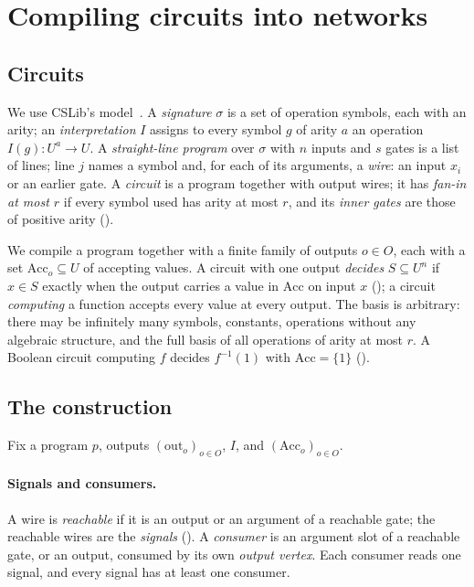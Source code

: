 \documentclass[11pt]{article}
\theoremstyle{plain}
\theoremstyle{definition}
\theoremstyle{remark}
\newcommand{\Acc}{\mathrm{Acc}}
\begin{document}
\section{Compiling circuits into networks}
\label{sec:compiler}

\subsection{Circuits}

We use CSLib's model~\cite{CSLib}. A \emph{signature} $\sigma$ is a set of operation symbols,
each with an arity; an \emph{interpretation} $I$ assigns to every symbol $g$ of arity $a$ an
operation $I(g) \colon U^a \to U$. A \emph{straight-line program} over $\sigma$ with $n$ inputs
and $s$ gates is a list of lines; line $j$ names a symbol and, for each of its arguments, a
\emph{wire}: an input $x_i$ or an earlier gate. A \emph{circuit} is a program together with
output wires; it has \emph{fan-in at most $r$} if every symbol used has arity at most $r$, and
its \emph{inner gates} are those of positive arity ().

We compile a program together with a finite family of outputs $o \in O$, each with a set
$\Acc_o \subseteq U$ of accepting values. A circuit with one output \emph{decides}
$S \subseteq U^n$ if $x \in S$ exactly when the output carries a value in $\Acc$ on input $x$
(); a circuit \emph{computing} a function accepts every value at every
output. The basis is arbitrary: there may be infinitely many symbols, constants, operations
without any algebraic structure, and the full basis of all operations of arity at most $r$. A
Boolean circuit computing $f$ decides $f^{-1}(1)$ with $\Acc = \{1\}$
().

\subsection{The construction}

Fix a program $p$, outputs $(\mathrm{out}_o)_{o \in O}$, $I$, and $(\Acc_o)_{o \in O}$.

\paragraph{Signals and consumers.} A wire is \emph{reachable} if it is an output or an argument
of a reachable gate; the reachable wires are the \emph{signals}
(). A \emph{consumer} is an argument slot of a reachable gate, or
an output, consumed by its own \emph{output vertex}. Each consumer reads one signal, and every
signal has at least one consumer.
\end{document}
